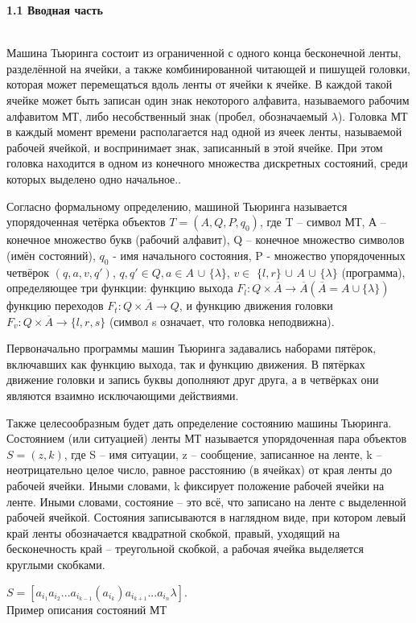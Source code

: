 \documentclass{article}
\begin{document}
\par \textbf{1.1 Вводная часть}\\
\\
\par Машина Тьюринга состоит из ограниченной с одного конца бесконечной ленты, разделённой на ячейки, а также комбинированной читающей и пишущей головки, которая может перемещаться вдоль ленты от ячейки к ячейке. В каждой такой ячейке может быть записан один знак некоторого алфавита, называемого рабочим алфавитом МТ, либо несобственный знак (пробел, обозначаемый $\lambda$). Головка МТ в каждый момент времени располагается над одной из ячеек ленты, называемой рабочей ячейкой, и воспринимает знак, записанный в этой ячейке. При этом головка находится в одном из конечного множества дискретных состояний, среди которых выделено одно начальное..\\
\par Согласно формальному определению, машиной Тьюринга называется упорядоченная четёрка объектов $T = (A, Q, P, q_0)$, где T – символ МТ, А – конечное множество букв (рабочий алфавит), Q – конечное множество символов (имён состояний), $q_0$ - имя начального состояния, P - множество упорядоченных четвёрок $(q,a,v,q')$, $q,q' \in Q, a \in A$ $\cup$ $\big\{ \lambda \big\}$, $v \in$ $\big\{l,r\big\} $ $\cup$ $A$ $\cup$ $\big\{ \lambda \big\}$ (программа), определяющее три функции: функцию выхода $F_l: Q \times \overline{A} \rightarrow \overline{A} (\overline{A} = A \cup \big\{ \lambda \big\})$ функцию переходов $F_t: Q \times \overline{A} \rightarrow Q$, и функцию движения головки $F_v: Q \times \overline{A} \rightarrow \big\{l,r,s\big\}$ (символ s означает, что головка неподвижна).\\
\par Первоначально программы машин Тьюринга задавались наборами пятёрок, включавших как функцию выхода, так и функцию движения. В пятёрках движение головки и запись буквы дополняют друг друга, а в четвёрках они являются взаимно исключающими действиями.\\
\par Также целесообразным будет дать определение состоянию машины Тьюринга. Состоянием (или ситуацией) ленты МТ называется упорядоченная пара объектов $S = (z,k)$, где S – имя ситуации, z – сообщение, записанное на ленте, k – неотрицательно целое число, равное расстоянию (в ячейках) от края ленты до рабочей ячейки. Иными словами, k фиксирует положение рабочей ячейки на ленте. Иными словами, состояние – это всё, что записано на ленте с выделенной рабочей ячейкой. Состояния записываются в наглядном виде, при котором левый край ленты обозначается квадратной скобкой, правый, уходящий на бесконечность край – треугольной скобкой, а рабочая ячейка выделяется круглыми скобками.\\ 
\begin{center}
    $S = [a_{i_1}a_{i_2}...a_{i_{k-1}}(a_{i_k})a_{i_{k+1}}...a_{i_n}\lambda]$.\\
    \small{Пример описания состояний МТ}
\end{center}
\end{document}
